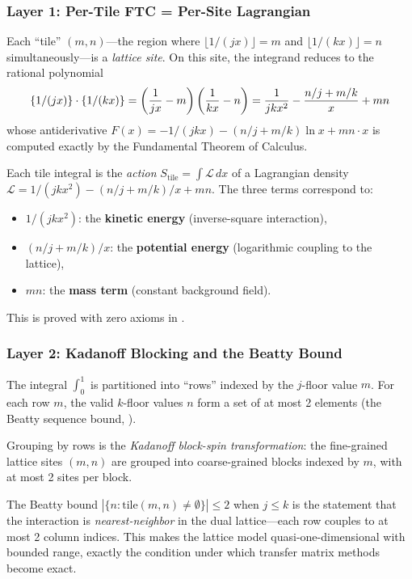 \documentclass[11pt,a4paper]{article}
\begin{document}
\subsubsection{Layer 1: Per-Tile FTC = Per-Site Lagrangian}

Each ``tile'' $(m,n)$---the region where $\lfloor 1/(jx) \rfloor = m$
and $\lfloor 1/(kx) \rfloor = n$ simultaneously---is a \emph{lattice site}.
On this site, the integrand reduces to the rational polynomial
\[
  \{1/(jx)\} \cdot \{1/(kx)\} =
  \left(\frac{1}{jx} - m\right)\left(\frac{1}{kx} - n\right)
  = \frac{1}{jkx^2} - \frac{n/j + m/k}{x} + mn
\]
whose antiderivative $F(x) = -1/(jkx) - (n/j + m/k)\ln x + mn \cdot x$
is computed exactly by the Fundamental Theorem of Calculus.

\begin{principle}
Each tile integral is the \emph{action} $S_{\mathrm{tile}} = \int \mathcal{L}\,dx$
of a Lagrangian density $\mathcal{L} = 1/(jkx^2) - (n/j+m/k)/x + mn$.
The three terms correspond to:
\begin{itemize}
  \item $1/(jkx^2)$: the \textbf{kinetic energy} (inverse-square interaction),
  \item $(n/j + m/k)/x$: the \textbf{potential energy} (logarithmic coupling to the lattice),
  \item $mn$: the \textbf{mass term} (constant background field).
\end{itemize}
This is proved with zero axioms in .
\end{principle}

\subsubsection{Layer 2: Kadanoff Blocking and the Beatty Bound}

The integral $\int_0^1$ is partitioned into ``rows'' indexed by the
$j$-floor value $m$. For each row $m$, the valid $k$-floor values
$n$ form a set of at most 2 elements (the Beatty sequence bound,
).

\begin{correspondence}
Grouping by rows is the \emph{Kadanoff block-spin transformation}:
the fine-grained lattice sites $(m,n)$ are grouped into coarse-grained
blocks indexed by $m$, with at most 2 sites per block.

The Beatty bound $|\{n : \text{tile}(m,n) \neq \emptyset\}| \leq 2$
when $j \leq k$ is the statement that the interaction is
\emph{nearest-neighbor} in the dual lattice---each row couples to at
most 2 column indices. This makes the lattice model quasi-one-dimensional
with bounded range, exactly the condition under which transfer matrix
methods become exact.
\end{correspondence}
\end{document}
